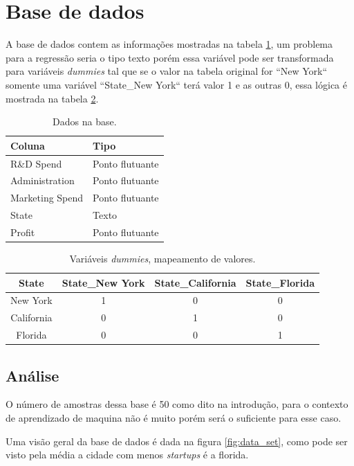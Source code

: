 \documentclass[11pt]{article}
\begin{document}
\section{Base de dados}
\label{sec:org9999818}

A base de dados contem as informações mostradas na tabela \ref{tab:cols}, um problema para a regressão seria o tipo texto porém essa variável pode ser transformada para variáveis \emph{dummies} tal que se o valor na tabela original for ``New York`` somente uma variável ``State\_New York`` terá valor 1 e as outras 0, essa lógica é mostrada na tabela \ref{tab:dummies}.

\begin{table}[htbp]
\centering
\begin{tabular}{ll}
Coluna & Tipo\\
\hline
R\&D Spend & Ponto flutuante\\
Administration & Ponto flutuante\\
Marketing Spend & Ponto flutuante\\
State & Texto\\
Profit & Ponto flutuante\\
\hline
\end{tabular}
\caption{\label{tab:cols}
Dados na base.}

\end{table}


\begin{table}[htbp]
\centering
\begin{tabular}{cccc}
State & State\_New York & State\_California & State\_Florida\\
\hline
New York & 1 & 0 & 0\\
California & 0 & 1 & 0\\
Florida & 0 & 0 & 1\\
\hline
\end{tabular}
\caption{\label{tab:dummies}
Variáveis \emph{dummies}, mapeamento de valores.}

\end{table}


\subsection{Análise}
\label{sec:org6f0371b}

O número de amostras dessa base é 50 como dito na introdução, para o contexto de aprendizado de maquina não é muito porém será o suficiente para esse caso.

Uma visão geral da base de dados é dada na figura \ref{fig:data_set}, como pode ser visto pela média a cidade com menos \emph{startups} é a florida.
\end{document}
